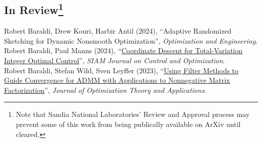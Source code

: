 \documentclass[11pt, a4paper]{article}
\newcommand{\years}[1]{\marginnote{#1}}
\begin{document}
\subsection*{In Review\footnote{\tiny Note that Sandia National Laboratories' Review and Approval process may prevent some of this work from being publically available on ArXiv until cleared. }}
\years{2024} Robert Baraldi, Drew Kouri, Harbir Antil (2024), ``Adaptive Randomized Sketching for Dynamic Nonsmooth Optimization'', \emph{Optimization and Engineering}. \\
\years{2024} Robert Baraldi, Paul Manns (2024), ``\href{https://arxiv.org/abs/2410.15672}{Coordinate Descent for Total-Variation Integer Optimal Control}'', \emph{SIAM Journal on Control and Optimization}. \\
\years{2023} Robert Baraldi, Stefan Wild, Sven Leyffer (2023), ``\href{https://optimization-online.org/2024/02/using-filter-methods-to-guide-convergence-for-admm-with-applications-to-nonnegative-matrix-factorization-problems/}{Using Filter Methods to Guide Convergence for ADMM with Applications to Nonnegative Matrix Factorization}'', \emph{Journal of Optimization Theory and Applications}.\\
\end{document}
